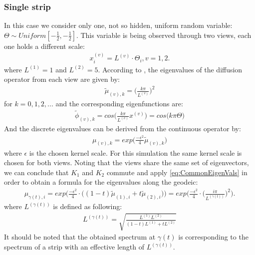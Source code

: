 \documentclass[]{article}
\theoremstyle{definition}
\begin{document}
	\subsubsection{Single strip}
	\label{subsubsec:1DStrips}
	In this case we consider only one, not so hidden, uniform random variable: $\Theta \sim  Uniform[-\frac{1}{2},-\frac{1}{2}]$. This variable is being observed through two views, each one holds a different scale:
	\begin{eqnarray*}
		\label{eq:1DStripData}
		x^{(v)}_i=L^{(v)} \cdot \Theta_i, v=1,2.
	\end{eqnarray*}
	where $L^{(1)}=1$ and $L^{(2)}=5$. According to \cite{dsilva2018parsimonious}, the eigenvalues of the diffusion operator from each view are given by:
	\begin{eqnarray*}
		\label{eq:1DStripContEigenvasl}
		\widetilde{\mu}_{(v),k}= \bigg( \frac{k\pi}{L^{(v)}} \bigg)^2
	\end{eqnarray*}
	for $k=0,1,2,...$ and the corresponding eigenfunctions are: 
	\begin{eqnarray*}
		\label{eq:1DStripContEigenfun}
		\widetilde{\phi}_{(v),k}=  cos\bigg( \frac{k\pi}{L^{(v)}} x^{(v)} \bigg) = cos\bigg( k\pi  \Theta\bigg)
	\end{eqnarray*}
	And the discrete eigenvalues can be derived from the continuous operator by:
	\begin{eqnarray*}
		\label{eq:1DStripContEigenfun}
		\mu_{(v),k}=  exp\bigg( \frac{-\epsilon ^2}{4}\widetilde{\mu}_{(v),k}\bigg)
	\end{eqnarray*}
	where $\epsilon$ is the chosen kernel scale. For this simulation the same kernel scale is chosen for both views. Noting that the views share the same set of eigenvectors, we can conclude that $K_1$ and $K_2$ commute and apply \ref{eq:CommonEigenVals} in order to obtain a formula for the eigenvalues along the geodeic:
	\begin{eqnarray*}
		\label{eq:1DStripCommonEigenVals}
		\mu_{\gamma(t),i} =  exp\bigg( \frac{-\epsilon ^2}{4}\cdot \big((1-t)\widetilde{\mu}_{(1),i}+t\widetilde{\mu}_{(2),i}\big) \bigg) = exp\bigg( \frac{-\epsilon ^2}{4}\cdot \bigg( \frac{i\pi}{L^{(\gamma(t))}} \bigg)^2 \bigg).
	\end{eqnarray*}
	where $L^{(\gamma(t))}$ is defined as following:
	\begin{eqnarray*}
		\label{eq:EffectiveLength}
		L^{(\gamma(t))} = \sqrt{ \frac{L^{(1)}L^{(2)}}{(1-t)L^{(1)}+tL^{(2)}} }
	\end{eqnarray*}
	It should be noted that the obtained spectrum at $\gamma(t)$ is corresponding to the spectrum of a strip with an effective length of $L^{(\gamma(t))}$.
\end{document}
